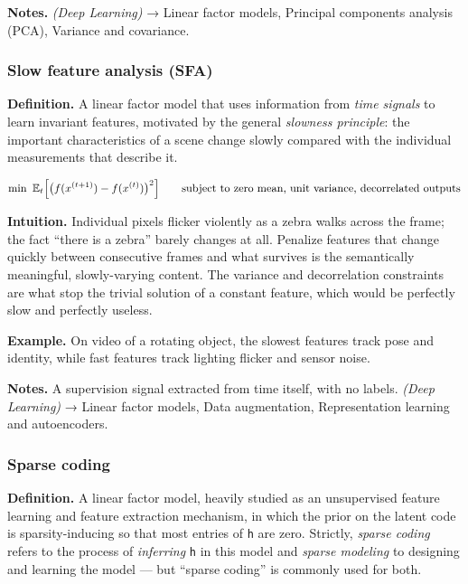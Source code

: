 \documentclass[
  10pt,
  letterpaper,
  onecolumn]{article}
\begin{document}
\textbf{Notes.} \emph{(Deep Learning)} → Linear factor models, Principal
components analysis (PCA), Variance and covariance.

\hypertarget{slow-feature-analysis-sfa}{%
\subsubsection{Slow feature analysis
(SFA)}\label{slow-feature-analysis-sfa}}

\textbf{Definition.} A linear factor model that uses information from
\emph{time signals} to learn invariant features, motivated by the
general \emph{slowness principle}: the important characteristics of a
scene change slowly compared with the individual measurements that
describe it.

\begin{equation*}
\min\ \mathbb{E}_t\Bigl[\bigl(f(x^{(t+1)})-f(x^{(t)})\bigr)^{2}\Bigr]
\qquad\text{subject to zero mean, unit variance, decorrelated outputs}
\end{equation*}

\textbf{Intuition.} Individual pixels flicker violently as a zebra walks
across the frame; the fact ``there is a zebra'' barely changes at all.
Penalize features that change quickly between consecutive frames and
what survives is the semantically meaningful, slowly-varying content.
The variance and decorrelation constraints are what stop the trivial
solution of a constant feature, which would be perfectly slow and
perfectly useless.

\textbf{Example.} On video of a rotating object, the slowest features
track pose and identity, while fast features track lighting flicker and
sensor noise.

\textbf{Notes.} A supervision signal extracted from time itself, with no
labels. \emph{(Deep Learning)} → Linear factor models, Data
augmentation, Representation learning and autoencoders.

\hypertarget{sparse-coding}{%
\subsubsection{Sparse coding}\label{sparse-coding}}

\textbf{Definition.} A linear factor model, heavily studied as an
unsupervised feature learning and feature extraction mechanism, in which
the prior on the latent code is sparsity-inducing so that most entries
of \texttt{h} are zero. Strictly, \emph{sparse coding} refers to the
process of \emph{inferring} \texttt{h} in this model and \emph{sparse
modeling} to designing and learning the model --- but ``sparse coding''
is commonly used for both.
\end{document}
